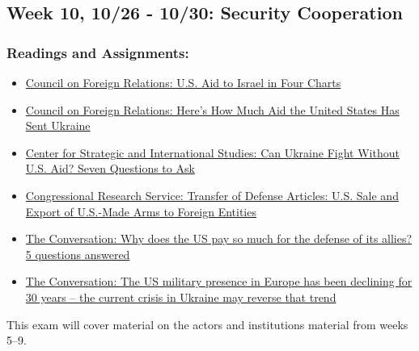 \documentclass[
  letterpaper,
  DIV=11,
  numbers=noendperiod]{scrartcl}
\providecommand{\tightlist}{%
  \setlength{\itemsep}{0pt}\setlength{\parskip}{0pt}}
\begin{document}
\subsection{Week 10, 10/26 - 10/30: Security
Cooperation}\label{week-10-1026---1030-security-cooperation}

\subsubsection{Readings and
Assignments:}\label{readings-and-assignments-9}

\begin{itemize}
\tightlist
\item
  \href{https://www.cfr.org/article/us-aid-israel-four-charts}{Council
  on Foreign Relations: U.S. Aid to Israel in Four Charts}
\item
  \href{https://www.cfr.org/article/how-much-us-aid-going-ukraine}{Council
  on Foreign Relations: Here's How Much Aid the United States Has Sent
  Ukraine}
\item
  \href{https://www.csis.org/analysis/can-ukraine-fight-without-us-aid-seven-questions-ask}{Center
  for Strategic and International Studies: Can Ukraine Fight Without
  U.S. Aid? Seven Questions to Ask}
\item
  \href{https://www.congress.gov/crs-product/R46337}{Congressional
  Research Service: Transfer of Defense Articles: U.S. Sale and Export
  of U.S.-Made Arms to Foreign Entities}
\item
  \href{https://theconversation.com/why-does-the-us-pay-so-much-for-the-defense-of-its-allies-5-questions-answered-127683}{The
  Conversation: Why does the US pay so much for the defense of its
  allies? 5 questions answered}
\item
  \href{https://theconversation.com/the-us-military-presence-in-europe-has-been-declining-for-30-years-the-current-crisis-in-ukraine-may-reverse-that-trend-175595}{The
  Conversation: The US military presence in Europe has been declining
  for 30 years -- the current crisis in Ukraine may reverse that trend}
\end{itemize}

\begin{tcolorbox}[enhanced jigsaw, arc=.35mm, bottomrule=.15mm, bottomtitle=1mm, breakable, colback=white, colbacktitle=quarto-callout-important-color!10!white, colframe=quarto-callout-important-color-frame, coltitle=black, left=2mm, leftrule=.75mm, opacityback=0, opacitybacktitle=0.6, rightrule=.15mm, title=\textcolor{quarto-callout-important-color}{\faExclamation}\hspace{0.5em}{Friday 10/30: Exam 2: Actors and Institutions}, titlerule=0mm, toprule=.15mm, toptitle=1mm]

This exam will cover material on the actors and institutions material
from weeks 5--9.

\end{tcolorbox}
\end{document}
